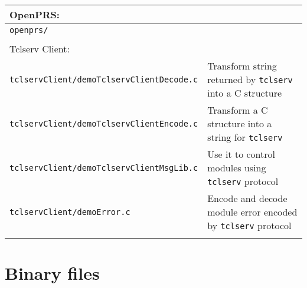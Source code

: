 \begin{center}
\begin{tabularx}{\linewidth}{|l|X|}
 \hline
 \multicolumn{2}{|l|}{OpenPRS:} \\
 \hline
 \texttt{openprs/}  & \\
 \hline
 \multicolumn{2}{l}{} \\

 \hline
 \multicolumn{2}{|l|}{Tclserv Client:} \\
 \hline
 \texttt{tclservClient/demoTclservClientDecode.c}  & Transform string returned by \texttt{tclserv} into a C structure\\
 \texttt{tclservClient/demoTclservClientEncode.c}  & Transform a C structure into a string for \texttt{tclserv} \\
 \texttt{tclservClient/demoTclservClientMsgLib.c} & Use it to control modules using \texttt{tclserv} protocol\\
 \texttt{tclservClient/demoError.c} & Encode and decode module error encoded
 by \texttt{tclserv} protocol \\
 \hline
 \multicolumn{2}{l}{} \\
 \end{tabularx}
\end{center}

\vfill\eject
\section{Binary files}

